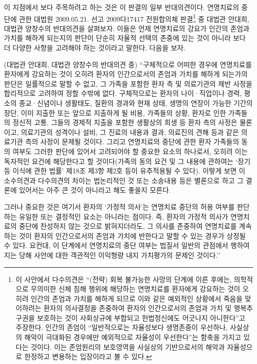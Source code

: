 이 지점에서 보다 주목하려고 하는 것은 이 판결의 일부 반대의견이다. 연명치료의 중단에 관한 대법원 2009.05.21. 선고 2009다17417 전원합의체 판결\footnote{이 사안에서 다수의견은 ``(전략) 회복 불가능한 사망의 단계에 이른 후에는, 의학적으로 무의미한 신체 침해 행위에 해당하는 연명치료를 환자에게 강요하는 것이 오히려 인간의 존엄과 가치를 해하게 되므로 이와 같은 예외적인 상황에서 죽음을 맞이하려는 환자의 의사결정을 존중하여 환자의 인간으로서의 존엄과 가치 및 행복추구권을 보호하는 것이 사회상규에 부합되고 헌법정신에도 어긋나지 아니한다''고 주장한다. 인간의 존엄이 ``일반적으로는 자율성보다 생명존중이 우선하나, 사실상의 해악이 극대화된 경우에만 예외적으로 자율성이 우선한다''는 함축을 가지고 있다는 것이다. 이는 존엄원리의 보호영역을 사실상의 기반으로서의 해악과 자율성으로 한정하고 변용하는 입장이라고 볼 수 있다.} 중 대법관 안대희, 대법관 양창수의 반대의견을 살펴보자. 이들은 언제 연명치료의 강요가 인간의 존엄과 가치를 해하게 되는지의 판단이 단순히 자율적 선택의 존중에 있는 것이 아니라 보다 더 다양한 사항을 고려해야 하는 것이라고 말한다. 다음을 보자.

(대법관 안대희, 대법관 양창수의 반대의견 중) ``구체적으로 어떠한 경우에 연명치료를 환자에게 강요하는 것이 오히려 환자의 인간으로서의 존엄과 가치를 해하게 되는가의 판단은 일률적으로 말할 수 없고, 그 가족을 포함한 환자 측 및 의료기관의 제반 사정을 합리적으로 고려하여 정할 수밖에 없다. 구체적으로는 환자의 나이·직업이나 경력, 평소의 종교·신념이나 생활태도, 질환의 경과와 현재 상태, 생명의 연장이 가능한 기간의 장단, 이미 지출한 또는 앞으로 지출하게 될 비용, 가족들의 상황, 환자로 인한 가족들의 정신적 고통, 그들의 경제적 지출을 포함한 생활상의 희생 등 환자 측의 사정은 물론이고, 의료기관의 성격이나 설비, 그 진료의 내용과 결과, 의료진의 견해 등과 같은 의료기관 측의 사정이 문제될 것이다. 그리고 연명치료의 중단에 관한 환자 가족들의 동의 여부도 그러한 판단에 있어서 고려되어야 할 중요한 요소의 하나로서, 오히려 이는 독자적인 요건에 해당한다고 할 것이다(가족의 동의 요건 및 그 내용에 관하여는 `장기 등 이식에 관한 법률' 제18조 제3항 제2호 등이 유추적용될 수 있다). 이렇게 보면 이 소수의견과 다수의견의 차이는 법논리적인 것 또는 소송내용 등은 별론으로 하고 그 결론에 있어서는 아주 큰 것이 아니라고 해도 좋을지 모른다.

그러나 중요한 것은 여기서 환자의 `가정적 의사'는 연명치료 중단의 허용 여부를 판단하는 유일한 또는 결정적인 요소는 아니라는 점이다. 즉, 환자의 가정적 의사가 연명치료의 중단에 찬성하지 않는 것으로 밝혀지더라도, 그 의사를 존중하여 연명치료를 계속하는 것이 환자의 인간으로서의 존엄과 가치에 반한다고 말할 수 있는 경우가 상정될 수 있다. 요컨대, 이 단계에서 연명치료의 중단 여부는 법질서 일반의 관점에서 행하여지는 당해 사안에 대한 객관적인 이익형량 내지 가치평가의 문제인 것이다.''

